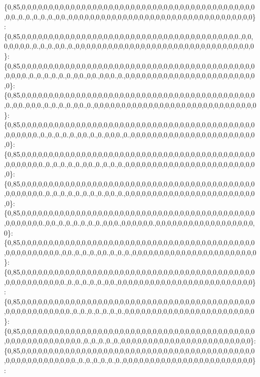 \{0,85,0,0,0,0,0,0,0,0,0,0,0,0,0,0,0,0,0,0,0,0,0,0,0,0,0,0,0,0,0,0,0,0,0,0,0,0,0,0,0,0,0,0,0,0,0.,0.,0.,0.,0.,0.,0,0.,0,0,0,0,0,0,0,0,0,0,0,0,0,0,0,0,0,0,0,0,0,0,0,0,0,0,0,0,0,0,0,0,0,0\}\+: \{0,85,0,0,0,0,0,0,0,0,0,0,0,0,0,0,0,0,0,0,0,0,0,0,0,0,0,0,0,0,0,0,0,0,0,0,0,0,0,0,0,0.,0,0,0,0,0,0,0.,0.,0.,0.,0,0.,0.,0,0,0,0,0,0,0,0,0,0,0,0,0,0,0,0,0,0,0,0,0,0,0,0,0,0,0,0,0,0,0,0,0\}\+: \{0,85,0,0,0,0,0,0,0,0,0,0,0,0,0,0,0,0,0,0,0,0,0,0,0,0,0,0,0,0,0,0,0,0,0,0,0,0,0,0,0,0,0,0,0,0,0,0,0.,0.,0.,0.,0.,0.,0.,0,0.,0,0.,0,0,0.,0.,0,0,0,0,0,0,0,0,0,0,0,0,0,0,0,0,0,0,0,0,0,0,0,0,0\}\+: \{0,85,0,0,0,0,0,0,0,0,0,0,0,0,0,0,0,0,0,0,0,0,0,0,0,0,0,0,0,0,0,0,0,0,0,0,0,0,0,0,0,0,0,0,0,0.,0,0.,0,0,0.,0.,0.,0.,0.,0,0.,0.,0,0,0,0,0,0,0,0,0,0,0,0,0,0,0,0,0,0,0,0,0,0,0,0,0,0,0,0,0,0\}\+: \{0,85,0,0,0,0,0,0,0,0,0,0,0,0,0,0,0,0,0,0,0,0,0,0,0,0,0,0,0,0,0,0,0,0,0,0,0,0,0,0,0,0,0,0,0,0,0,0,0,0,0.,0.,0.,0.,0.,0.,0,0.,0.,0.,0,0,0.,0.,0,0,0,0,0,0,0,0,0,0,0,0,0,0,0,0,0,0,0,0,0,0,0,0\}\+: \{0,85,0,0,0,0,0,0,0,0,0,0,0,0,0,0,0,0,0,0,0,0,0,0,0,0,0,0,0,0,0,0,0,0,0,0,0,0,0,0,0,0,0,0,0,0,0,0,0,0,0,0.,0.,0.,0.,0.,0.,0,0.,0.,0.,0.,0.,0,0,0,0,0,0,0,0,0,0,0,0,0,0,0,0,0,0,0,0,0,0,0,0,0\}\+: \{0,85,0,0,0,0,0,0,0,0,0,0,0,0,0,0,0,0,0,0,0,0,0,0,0,0,0,0,0,0,0,0,0,0,0,0,0,0,0,0,0,0,0,0,0,0,0,0,0,0,0,0.,0.,0.,0.,0.,0.,0.,0.,0.,0,0.,0.,0,0,0,0,0,0,0,0,0,0,0,0,0,0,0,0,0,0,0,0,0,0,0,0,0\}\+: \{0,85,0,0,0,0,0,0,0,0,0,0,0,0,0,0,0,0,0,0,0,0,0,0,0,0,0,0,0,0,0,0,0,0,0,0,0,0,0,0,0,0,0,0,0,0,0,0,0,0,0,0.,0,0.,0.,0.,0.,0.,0.,0.,0,0,0.,0,0,0,0,0,0.,0,0,0,0,0,0,0,0,0,0,0,0,0,0,0,0,0,0,0\}\+: \{0,85,0,0,0,0,0,0,0,0,0,0,0,0,0,0,0,0,0,0,0,0,0,0,0,0,0,0,0,0,0,0,0,0,0,0,0,0,0,0,0,0,0,0,0,0,0,0,0,0,0,0,0,0,0.,0,0.,0.,0.,0.,0,0.,0.,0.,0.,0,0,0,0,0,0,0,0,0,0,0,0,0,0,0,0,0,0,0,0,0,0,0\}\+: \{0,85,0,0,0,0,0,0,0,0,0,0,0,0,0,0,0,0,0,0,0,0,0,0,0,0,0,0,0,0,0,0,0,0,0,0,0,0,0,0,0,0,0,0,0,0,0,0,0,0,0,0,0,0,0,0.,0.,0.,0.,0.,0.,0,0.,0,0,0,0,0,0,0,0,0,0,0,0,0,0,0,0,0,0,0,0,0,0,0,0,0\}\+: \{0,85,0,0,0,0,0,0,0,0,0,0,0,0,0,0,0,0,0,0,0,0,0,0,0,0,0,0,0,0,0,0,0,0,0,0,0,0,0,0,0,0,0,0,0,0,0,0,0,0,0,0,0,0,0,0,0.,0.,0.,0.,0.,0.,0.,0.,0,0,0,0,0,0,0,0,0,0,0,0,0,0,0,0,0,0,0,0,0,0,0,0\}\+: \{0,85,0,0,0,0,0,0,0,0,0,0,0,0,0,0,0,0,0,0,0,0,0,0,0,0,0,0,0,0,0,0,0,0,0,0,0,0,0,0,0,0,0,0,0,0,0,0,0,0,0,0,0,0,0,0,0,0,0.,0.,0.,0.,0.,0.,0,0,0,0,0,0,0,0,0,0,0,0,0,0,0,0,0,0,0,0,0,0,0,0\}\+: \{0,85,0,0,0,0,0,0,0,0,0,0,0,0,0,0,0,0,0,0,0,0,0,0,0,0,0,0,0,0,0,0,0,0,0,0,0,0,0,0,0,0,0,0,0,0,0,0,0,0,0,0,0,0,0,0,0,0.,0.,0.,0.,0.,0.,0.,0,0,0,0,0,0,0,0,0,0,0,0,0,0,0,0,0,0,0,0,0,0,0,0\}\+: 